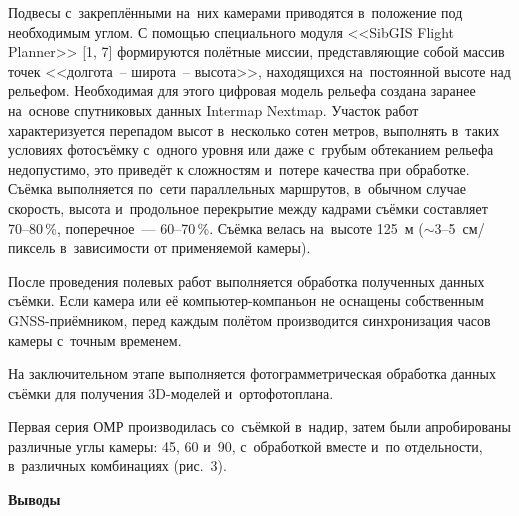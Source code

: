 Подвесы с~закреплёнными на~них камерами приводятся в~положение под необходимым углом.
\clearpage
С помощью специального модуля <<SibGIS Flight Planner>> [1, 7] формируются полётные миссии, представляющие собой массив точек <<долгота~-- широта~-- высота>>, находящихся на~постоянной высоте над рельефом. Необходимая для этого цифровая модель рельефа создана заранее на~основе спутниковых данных Intermap Nextmap. Участок работ характеризуется перепадом высот в~несколько сотен метров, выполнять в~таких условиях фотосъёмку с~одного уровня или даже с~грубым обтеканием рельефа недопустимо, это приведёт к сложностям и~потере качества при обработке. Съёмка выполняется по~сети параллельных маршрутов, в~обычном случае скорость, высота и~продольное перекрытие между кадрами съёмки составляет 70--80\,\%, поперечное~--- 60--70\,\%. Съёмка велась на~высоте 125~м ($\sim$3--5~см/пиксель в~зависимости от применяемой камеры).

После проведения полевых работ выполняется обработка полученных данных съёмки. Если камера или её компьютер-компаньон не оснащены собственным GNSS-приёмником, перед каждым полётом производится синхронизация часов камеры с~точным временем.

На заключительном этапе выполняется фотограмметрическая обработка данных съёмки для получения 3D-моделей и~ортофотоплана.

Первая серия ОМР производилась со~съёмкой в~надир, затем были апробированы различные углы камеры: 45, 60 и~90\dg, с~обработкой вместе и~по отдельности, в~различных комбинациях (рис.~3).


\clearpage
\textbf{Выводы}

